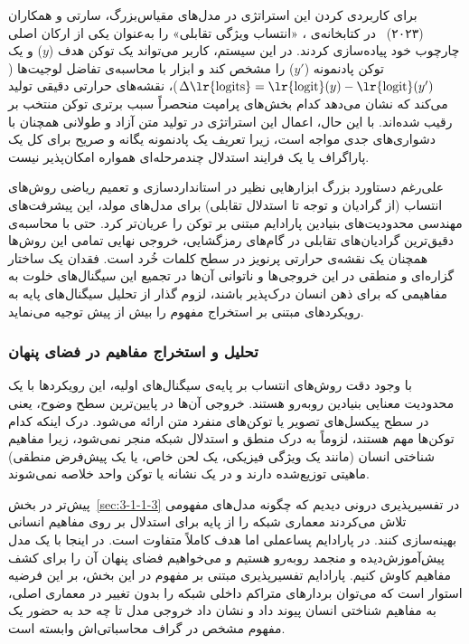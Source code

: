 برای کاربردی کردن این استراتژی در مدل‌های مقیاس‌بزرگ، سارتی و همکاران (۲۰۲۳)~\cite{sarti2023inseq} در کتابخانه‌ی ، «انتساب ویژگی تقابلی» را به‌عنوان یکی از ارکان اصلی چارچوب خود پیاده‌سازی کردند. در این سیستم، کاربر می‌تواند یک توکن هدف ($y$) و یک توکن پادنمونه ($y'$) را مشخص کند و ابزار با محاسبه‌ی تفاضل لوجیت‌ها ($\Delta \text{\lr{logits}} = \text{\lr{logit}}(y) - \text{\lr{logit}}(y')$)، نقشه‌های حرارتی دقیقی تولید می‌کند که نشان می‌دهد کدام بخش‌های پرامپت منحصراً سبب برتری توکن منتخب بر رقیب شده‌اند. با این حال، اعمال این استراتژی در تولید متن آزاد و طولانی همچنان با دشواری‌های جدی مواجه است، زیرا تعریف یک پادنمونه یگانه و صریح برای کل یک پاراگراف یا یک فرایند استدلال چندمرحله‌ای همواره امکان‌پذیر نیست.

علی‌رغم دستاورد بزرگ ابزارهایی نظیر  در استانداردسازی و تعمیم ریاضی روش‌های انتساب (از گرادیان و توجه تا استدلال تقابلی) برای مدل‌های مولد، این پیشرفت‌های مهندسی محدودیت‌های بنیادین پارادایم مبتنی بر توکن را عریان‌تر کرد. حتی با محاسبه‌ی دقیق‌ترین گرادیان‌های تقابلی در گام‌های رمزگشایی، خروجی نهایی تمامی این روش‌ها همچنان یک نقشه‌ی حرارتی پرنویز در سطح کلمات خُرد است. فقدان یک ساختار گزاره‌ای و منطقی در این خروجی‌ها و ناتوانی آن‌ها در تجمیع این سیگنال‌های خلوت به مفاهیمی که برای ذهن انسان درک‌پذیر باشند، لزوم گذار از تحلیل سیگنال‌های پایه به رویکردهای مبتنی بر استخراج مفهوم را بیش از پیش توجیه می‌نماید.


\subsubsection{تحلیل و استخراج مفاهیم در فضای پنهان}\label{sec:3-1-2-2}

با وجود دقت روش‌های انتساب بر پایه‌ی سیگنال‌های اولیه، این رویکردها با یک محدودیت معنایی بنیادین روبه‌رو هستند. خروجی آن‌ها در پایین‌ترین سطح وضوح، یعنی در سطح پیکسل‌های تصویر یا توکن‌های منفرد متن ارائه می‌شود. درک اینکه کدام توکن‌ها مهم هستند، لزوماً به درک منطق و استدلال شبکه منجر نمی‌شود، زیرا مفاهیم شناختی انسان (مانند یک ویژگی فیزیکی، یک لحن خاص، یا یک پیش‌فرض منطقی) ماهیتی توزیع‌شده دارند و در یک نشانه یا توکن واحد خلاصه نمی‌شوند.

پیش‌تر در بخش~\ref{sec:3-1-1-3} در تفسیرپذیری درونی دیدیم که چگونه مدل‌های مفهومی تلاش می‌کردند معماری شبکه را از پایه برای استدلال بر روی مفاهیم انسانی بهینه‌سازی کنند. در پارادایم پساعملی اما هدف کاملاً متفاوت است. در اینجا با یک مدل پیش‌آموزش‌دیده و منجمد روبه‌رو هستیم و می‌خواهیم فضای پنهان آن را برای کشف مفاهیم کاوش کنیم. پارادایم تفسیرپذیری مبتنی بر مفهوم در این بخش، بر این فرضیه استوار است که می‌توان بردارهای متراکم داخلی شبکه را بدون تغییر در معماری اصلی، به مفاهیم شناختی انسان پیوند داد و نشان داد خروجی مدل تا چه حد به حضور یک مفهوم مشخص در گراف محاسباتی‌اش وابسته است.

